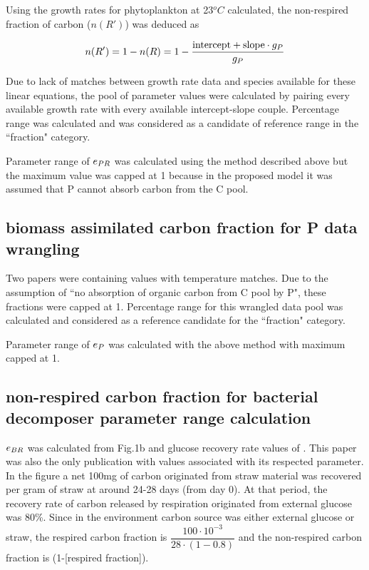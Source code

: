 \documentclass[../thesis.tex]{subfiles} %
\begin{document}
Using the growth rates for phytoplankton at 23$^oC$ calculated, the non-respired fraction of carbon ($n(R')$) was deduced as

\begin{equation}
    n(R') = 1-n(R) = 1-\dfrac{\text{intercept}+\text{slope}\cdot g_P}{g_P}
    \label{ePReqn}
\end{equation}

Due to lack of matches between growth rate data and species available for these linear equations, the pool of parameter values were calculated by pairing every available growth rate with every available intercept-slope couple.  Percentage range was calculated and was considered as a candidate of reference range in the ``fraction" category.

Parameter range of $e_{PR}$ was calculated using the method described above but the maximum value was capped at 1 because in the proposed model it was assumed that P cannot absorb carbon from the C pool.

\subsection{biomass assimilated carbon fraction for P data wrangling}
Two papers were containing values with temperature matches.  Due to the assumption of ``no absorption of organic carbon from C pool by P", these fractions were capped at 1.  Percentage range for this wrangled data pool was calculated and considered as a reference candidate for the ``fraction" category.

Parameter range of $e_P$ was calculated with the above method with maximum capped at 1.

\subsection{non-respired carbon fraction for bacterial decomposer parameter range calculation}
$e_{BR}$ was calculated from Fig.1b and glucose recovery rate values of \autocite{cochran1988estimation}.  This paper was also the only publication with values associated with its respected parameter.  In the figure a net 100mg of carbon originated from straw material was recovered per gram of straw at around 24-28 days (from day 0).  At that period, the recovery rate of carbon released by respiration originated from external glucose was 80\%.  Since in the environment carbon source was either external glucose or straw, the respired carbon fraction is $\dfrac{100\cdot10^{-3}}{28\cdot(1-0.8)}$ and the non-respired carbon fraction is (1-[respired fraction]).
\end{document}
